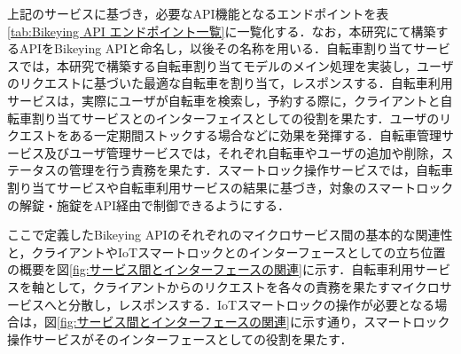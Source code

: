           \par 上記のサービスに基づき，必要なAPI機能となるエンドポイントを表\ref{tab:Bikeying API エンドポイント一覧}に一覧化する．なお，本研究にて構築するAPIをBikeying APIと命名し，以後その名称を用いる．自転車割り当てサービスでは，本研究で構築する自転車割り当てモデルのメイン処理を実装し，ユーザのリクエストに基づいた最適な自転車を割り当て，レスポンスする．自転車利用サービスは，実際にユーザが自転車を検索し，予約する際に，クライアントと自転車割り当てサービスとのインターフェイスとしての役割を果たす．ユーザのリクエストをある一定期間ストックする場合などに効果を発揮する．自転車管理サービス及びユーザ管理サービスでは，それぞれ自転車やユーザの追加や削除，ステータスの管理を行う責務を果たす．スマートロック操作サービスでは，自転車割り当てサービスや自転車利用サービスの結果に基づき，対象のスマートロックの解錠・施錠をAPI経由で制御できるようにする．
          \par ここで定義したBikeying APIのそれぞれのマイクロサービス間の基本的な関連性と，クライアントやIoTスマートロックとのインターフェースとしての立ち位置の概要を図\ref{fig:サービス間とインターフェースの関連}に示す．自転車利用サービスを軸として，クライアントからのリクエストを各々の責務を果たすマイクロサービスへと分散し，レスポンスする．IoTスマートロックの操作が必要となる場合は，図\ref{fig:サービス間とインターフェースの関連}に示す通り，スマートロック操作サービスがそのインターフェースとしての役割を果たす．

